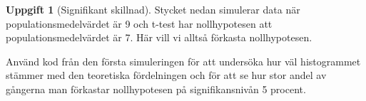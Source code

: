 \documentclass[
]{book}
\newenvironment{Shaded}{\begin{snugshade}}{\end{snugshade}}
\newcommand{\AttributeTok}[1]{\textcolor[rgb]{0.13,0.29,0.53}{#1}}
\newcommand{\ControlFlowTok}[1]{\textcolor[rgb]{0.13,0.29,0.53}{\textbf{#1}}}
\newcommand{\DecValTok}[1]{\textcolor[rgb]{0.00,0.00,0.81}{#1}}
\newcommand{\FunctionTok}[1]{\textcolor[rgb]{0.13,0.29,0.53}{\textbf{#1}}}
\newcommand{\NormalTok}[1]{#1}
\newcommand{\OtherTok}[1]{\textcolor[rgb]{0.56,0.35,0.01}{#1}}
\newcommand{\SpecialCharTok}[1]{\textcolor[rgb]{0.81,0.36,0.00}{\textbf{#1}}}
\theoremstyle{definition}
\theoremstyle{definition}
\theoremstyle{definition}
\newtheorem{exercise}{Uppgift}[chapter]
\theoremstyle{definition}
\theoremstyle{remark}
\begin{document}
\begin{exercise}[Signifikant skillnad]
Stycket nedan simulerar data när populationsmedelvärdet är 9 och t-test har nollhypotesen att populationsmedelvärdet är 7. Här vill vi alltså förkasta nollhypotesen.

\begin{Shaded}
\end{Shaded}

Använd kod från den första simuleringen för att undersöka hur väl histogrammet stämmer med den teoretiska fördelningen och för att se hur stor andel av gångerna man förkastar nollhypotesen på signifikansnivån 5 procent.
\end{exercise}
\end{document}
